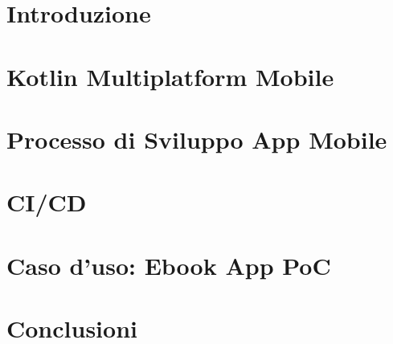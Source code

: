 \documentclass[12pt,a4paper]{report}
\begin{document}
\tableofcontents

\chapter{Introduzione}
\label{ch:introduzione}


\chapter{Kotlin Multiplatform Mobile}
\label{ch:kmm}


\chapter{Processo di Sviluppo App Mobile}
\label{ch:ch3}


\chapter{CI/CD}
\label{ch:ch4}


\chapter{Caso d'uso: Ebook App PoC}
\label{ch:ch5}


\chapter{Conclusioni}
\label{ch:ch6}




\end{document}
